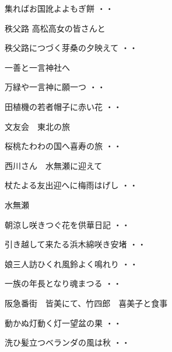 \begin{shiika}集ればお国訛よよもぎ餅
\hfill{・・}\end{shiika}
\vspace{0.6cm}
秩父路 高松高女の皆さんと
\begin{shiika}秩父路につづく芽桑の夕映えて
\hfill{・・}\end{shiika}
\vspace{0.6cm}
一善と一言神社へ
\begin{shiika}万緑や一言神に願一つ
\hfill{・・}\end{shiika}
\begin{shiika}田植機の若者帽子に赤い花
\hfill{・・}\end{shiika}
\vspace{0.6cm}
文友会　東北の旅
\begin{shiika}桜桃たわわの国へ喜寿の旅
\hfill{・・}\end{shiika}
\vspace{0.6cm}
西川さん　水無瀬に迎えて
\begin{shiika}杖たよる友出迎へに梅雨はげし
\hfill{・・}\end{shiika}
\vspace{0.6cm}
水無瀬
\begin{shiika}朝涼し咲きつぐ花を供華日記
\hfill{・・}\end{shiika}
\begin{shiika}引き越して来たる浜木綿咲き安堵
\hfill{・・}\end{shiika}
\begin{shiika}娘三人訪ひくれ風鈴よく鳴れり
\hfill{・・}\end{shiika}
\begin{shiika}一族の年長となり魂まつる
\hfill{・・}\end{shiika}
\vspace{0.6cm}
阪急番街　皆美にて、竹四郎　喜美子と食事
\begin{shiika}動かぬ灯動く灯一望盆の果
\hfill{・・}\end{shiika}
\begin{shiika}洗ひ髪立つベランダの風は秋
\hfill{・・}\end{shiika}
